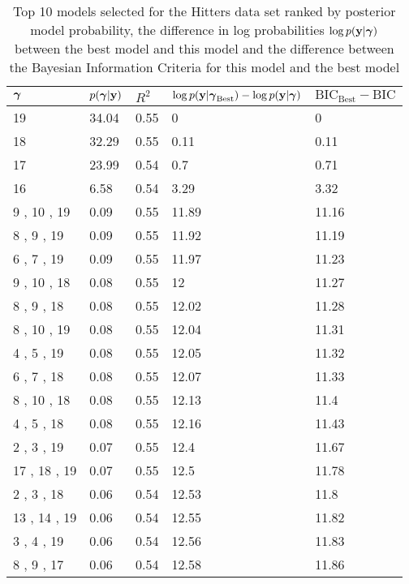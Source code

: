 \documentclass{amsart}
\begin{document}
\begin{table}
\label{tab:numerical_results_hitters}
\caption{Top 10 models selected for the Hitters data set ranked by posterior model probability, the difference
					in log probabilities $\log p({\bf y}|{\boldsymbol \gamma})$ between the best model and this model and the difference
					between the Bayesian Information Criteria for this model and the best model}
\begin{tabular}{|l|llll|}
\hline
${\boldsymbol \gamma}$ & $p({\boldsymbol \gamma}|{\bf y})$ & $R^2$ & $\log p({\bf y} | {\boldsymbol \gamma}_\text{Best}) - \log p({\bf y} | {\boldsymbol \gamma})$ & $\text{BIC}_\text{Best} - \text{BIC}$ \\
\hline
19 &  34.04&  0.55&  0&  0\\
18 &  32.29&  0.55&  0.11&  0.11\\
17 &  23.99&  0.54&  0.7&  0.71\\
16 &  6.58&  0.54&  3.29&  3.32\\
9 , 10 , 19&  0.09&  0.55&  11.89&  11.16\\
8 , 9 , 19&  0.09&  0.55&  11.92&  11.19\\
6 , 7 , 19&  0.09&  0.55&  11.97&  11.23\\
9 , 10 , 18&  0.08&  0.55&  12&  11.27\\
8 , 9 , 18&  0.08&  0.55&  12.02&  11.28\\
8 , 10 , 19&  0.08&  0.55&  12.04&  11.31\\
4 , 5 , 19&  0.08&  0.55&  12.05&  11.32\\
6 , 7 , 18&  0.08&  0.55&  12.07&  11.33\\
8 , 10 , 18&  0.08&  0.55&  12.13&  11.4\\
4 , 5 , 18&  0.08&  0.55&  12.16&  11.43\\
2 , 3 , 19&  0.07&  0.55&  12.4&  11.67\\
17 , 18 , 19&  0.07&  0.55&  12.5&  11.78\\
2 , 3 , 18&  0.06&  0.54&  12.53&  11.8\\
13 , 14 , 19&  0.06&  0.54&  12.55&  11.82\\
3 , 4 , 19&  0.06&  0.54&  12.56&  11.83\\
8 , 9 , 17&  0.06&  0.54&  12.58&  11.86\\
\hline
\end{tabular}
\end{table}
\end{document}
